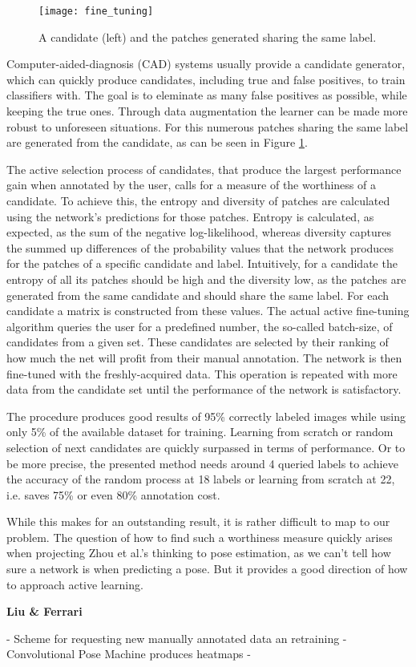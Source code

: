 \begin{figure}[!tbp]
	\centering
    \texttt{[image: fine\_tuning]}
	\caption{A candidate (left) and the patches generated sharing the same label. \cite{zhou}}
	\label{fig:zhou}
\end{figure}

Computer-aided-diagnosis (CAD) systems usually provide a candidate generator, which can quickly produce candidates, including true and false positives, to train classifiers with. The goal is to eleminate as many false positives as possible, while keeping the true ones. Through data augmentation the learner can be made more robust to unforeseen situations. For this numerous patches sharing the same label are generated from the candidate, as can be seen in Figure \ref{fig:zhou}. 

The active selection process of candidates, that produce the largest performance gain when annotated by the user, calls for a measure of the worthiness of a candidate. To achieve this, the entropy and diversity of patches are calculated using the network's predictions for those patches. Entropy is calculated, as expected, as the sum of the negative log-likelihood, whereas diversity captures the summed up differences of the probability values that the network produces for the patches of a specific candidate and label. Intuitively, for a candidate the entropy of all its patches should be high and the diversity low, as the patches are generated from the same candidate and should share the same label. For each candidate a matrix is constructed from these values. The actual active fine-tuning algorithm queries the user for a predefined number, the so-called batch-size, of candidates from a given set. These candidates are selected by their ranking of how much the net will profit from their manual annotation. The network is then fine-tuned with the freshly-acquired data. This operation is repeated with more data from the candidate set until the performance of the network is satisfactory.

The procedure produces good results of 95\% correctly labeled images while using only 5\% of the available dataset for training. Learning from scratch or random selection of next candidates are quickly surpassed in terms of performance. Or to be more precise, the presented method needs around 4 queried labels to achieve the accuracy of the random process at 18 labels or learning from scratch at 22, i.e. saves 75\% or even 80\% annotation cost.

While this makes for an outstanding result, it is rather difficult to map to our problem. The question of how to find such a worthiness measure quickly arises when projecting Zhou et al.'s thinking to pose estimation, as we can't tell how sure a network is when predicting a pose. But it provides a good direction of how to approach active learning.

\quad \textbf{Liu \& Ferrari}

- Scheme for requesting new manually annotated data an retraining
- Convolutional Pose Machine produces heatmaps
- 